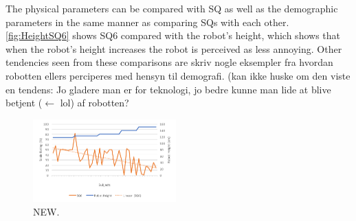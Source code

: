 The physical parameters can be compared with SQ as well as the demographic parameters in the same manner as comparing SQs with each other. \autoref{fig:HeightSQ6} shows SQ6 compared with the robot's height, which shows that when the robot's height increases the robot is perceived as less annoying. Other tendencies seen from these comparisons are {\color{red} skriv nogle eksempler fra hvordan robotten ellers perciperes med hensyn til demografi. (kan ikke huske om den viste en tendens: Jo gladere man er for teknologi, jo bedre kunne man lide at blive betjent ($\leftarrow$ lol) af robotten?}
%
\begin{figure}[H]
	\centering
	\includegraphics[width = 0.49\textwidth]{Figure/HeightSQ6}
	\setlength{} 
	\caption{NEW.}
	\label{fig:HeightSQ6}
\end{figure}
\noindent
%